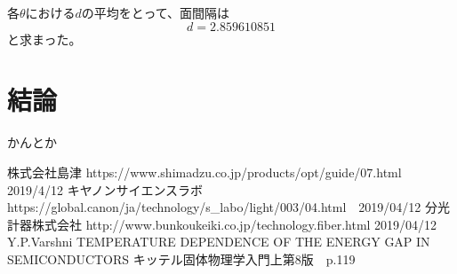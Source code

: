 \documentclass[11pt,a4j,uplatex]{jsarticle}
\begin{document}
 各$\theta$における$d$の平均をとって、面間隔は
 \begin{equation}
  d=2.859610851
  \label{fin}
 \end{equation}
 と求まった。
\fi

\section{結論}
かんとか

\newpage
\begin{thebibliography}{9}
 株式会社島津 https://www.shimadzu.co.jp/products/opt/guide/07.html 2019/4/12
  キヤノンサイエンスラボ https://global.canon/ja/technology/s\_labo/light/003/04.html　2019/04/12
  分光計器株式会社 http://www.bunkoukeiki.co.jp/technology.fiber.html 2019/04/12
 Y.P.Varshni TEMPERATURE DEPENDENCE OF THE ENERGY GAP IN SEMICONDUCTORS
 キッテル固体物理学入門上第8版　p.119


\end{thebibliography}
\end{document}
